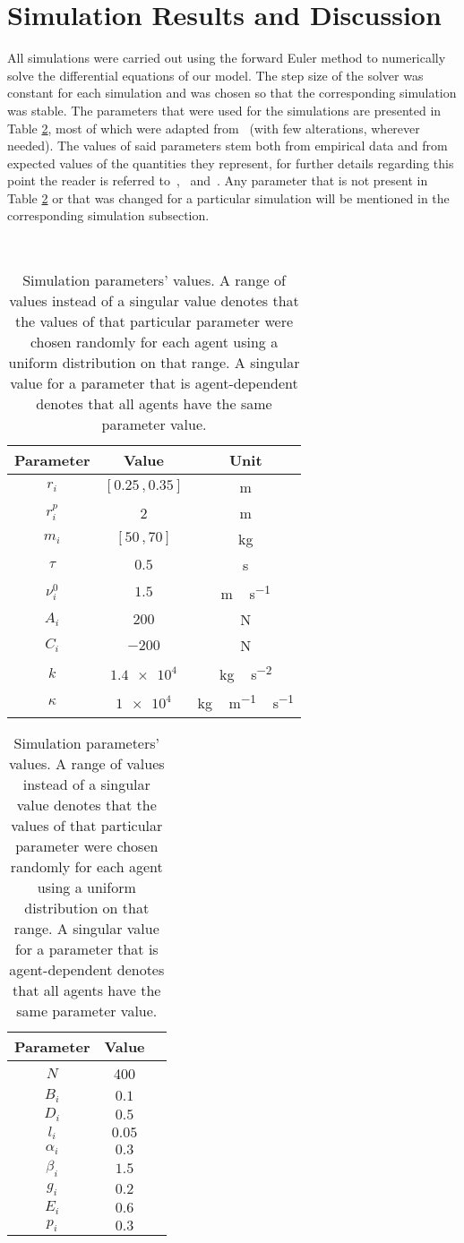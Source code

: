 \section{Simulation Results and Discussion}
All simulations were carried out using the forward Euler method to numerically solve the differential equations of our model. The step size of the solver was constant for each simulation and was chosen so that the corresponding simulation was stable. The parameters that were used for the simulations are presented in Table \ref{tab:param}, most of which were adapted from~\citet{Wang2016} (with few alterations, wherever needed). The values of said parameters stem both from empirical data and from expected values of the quantities they represent, for further details regarding this point the reader is referred to~\citet{Helbing2000},~\citet{Zainuddin2010} and~\citet{Wang2016}. Any parameter that is not present in Table \ref{tab:param} or that was changed for a particular simulation will be mentioned in the corresponding simulation subsection.

\begin{table}[ht!]
	\, \hfill
	\begin{tabular}{c c c}
		\hline
		Parameter & Value & Unit \\ \hline
		$r_i$ & $[0.25 \,, 0.35]$ & \si{\meter} \\
		$r_i^p$ & 2 & \si{\meter} \\
		$m_i$ & $[50 \,, 70]$ & \si{\kilogram} \\
		$\tau$ & $0.5$ & \si{\second} \\
		$\nu_i^0$ & $1.5$ & \si{\meter\,\second^{-1}} \\
		$A_i$ & $200$ & \si{\newton} \\
		$C_i$ & $-200$ & \si{\newton} \\
		$k$ & $\num{1.4e4}$ & \si{\kilogram\,\second^{-2}} \\
		$\kappa$ & $\num{1e4}$ & \si{\kilogram\,\meter^{-1}\,\second^{-1}} \\
	\end{tabular}
	\hfill
	\begin{tabular}{c c c}
		\hline
		Parameter & Value & \\ \hline
		$N$ & 400 & \\
		$B_i$ & $0.1$ &  \\
		$D_i$ & $0.5$ &  \\
		$l_i$ & $0.05$ &  \\
		$\alpha_i$ & $0.3$ &  \\
		$\beta_i$ & $1.5$ &  \\
		$g_i$ & $0.2$ &  \\
		$E_i$ & $0.6$ &  \\
		$p_i$ & $0.3$ &  \\
	\end{tabular}
	\hfill \,
	\caption{Simulation parameters' values. A range of values instead of a singular value denotes that the values of that particular parameter were chosen randomly for each agent using a uniform distribution on that range. A singular value for a parameter that is agent-dependent denotes that all agents have the same parameter value.}
	\label{tab:param}
\end{table}


